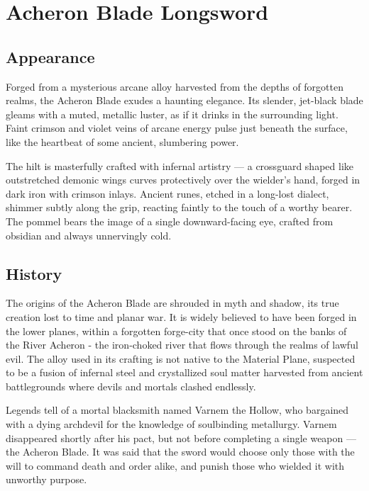 
\chapter*{Acheron Blade Longsword}

\section*{Appearance}
Forged from a mysterious arcane alloy harvested from the depths of forgotten realms, the Acheron Blade exudes a haunting elegance. Its slender, jet-black blade gleams with a muted, metallic luster, as if it drinks in the surrounding light. Faint crimson and violet veins of arcane energy pulse just beneath the surface, like the heartbeat of some ancient, slumbering power.

The hilt is masterfully crafted with infernal artistry — a crossguard shaped like outstretched demonic wings curves protectively over the wielder's hand, forged in dark iron with crimson inlays. Ancient runes, etched in a long-lost dialect, shimmer subtly along the grip, reacting faintly to the touch of a worthy bearer. The pommel bears the image of a single downward-facing eye, crafted from obsidian and always unnervingly cold.

\section*{History}
The origins of the Acheron Blade are shrouded in myth and shadow, its true creation lost to time and planar war. It is widely believed to have been forged in the lower planes, within a forgotten forge-city that once stood on the banks of the River Acheron - the iron-choked river that flows through the realms of lawful evil. The alloy used in its crafting is not native to the Material Plane, suspected to be a fusion of infernal steel and crystallized soul matter harvested from ancient battlegrounds where devils and mortals clashed endlessly.

Legends tell of a mortal blacksmith named Varnem the Hollow, who bargained with a dying archdevil for the knowledge of soulbinding metallurgy. Varnem disappeared shortly after his pact, but not before completing a single weapon — the Acheron Blade. It was said that the sword would choose only those with the will to command death and order alike, and punish those who wielded it with unworthy purpose.


